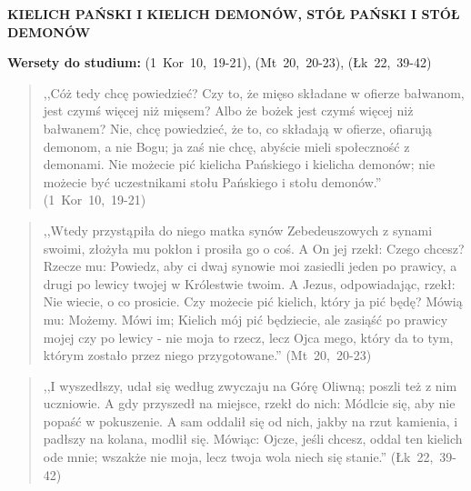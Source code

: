 \documentclass[10pt,a4paper,oneside]{article}
\begin{document}
\centerline{\textbf{\MakeUppercase{Kielich Pański i kielich demonów, stół Pański i stół demonów}}}
\begin{center}
\textbf{Wersety do studium:} \mbox{(1 Kor 10, 19-21)}, \mbox{(Mt 20, 20-23)}, \mbox{(Łk 22, 39-42)}
\end{center}
\begin{quote}
,,Cóż tedy chcę powiedzieć? Czy to, że mięso składane w ofierze bałwanom, jest czymś więcej niż mięsem? Albo że bożek jest czymś więcej niż bałwanem? Nie, chcę powiedzieć, że to, co składają w ofierze, ofiarują demonom, a nie Bogu; ja zaś nie chcę, abyście mieli społeczność z demonami. Nie możecie pić kielicha Pańskiego i kielicha demonów; nie możecie być uczestnikami stołu Pańskiego i stołu demonów.'' \mbox{(1 Kor 10, 19-21)}
\end{quote}
\begin{quote}
,,Wtedy przystąpiła do niego matka synów Zebedeuszowych z synami swoimi, złożyła mu pokłon i prosiła go o coś. A On jej rzekł: Czego chcesz? Rzecze mu: Powiedz, aby ci dwaj synowie moi zasiedli jeden po prawicy, a drugi po lewicy twojej w Królestwie twoim. A Jezus, odpowiadając, rzekł: Nie wiecie, o co prosicie. Czy możecie pić kielich, który ja pić będę? Mówią mu: Możemy. Mówi im; Kielich mój pić będziecie, ale zasiąść po prawicy mojej czy po lewicy - nie moja to rzecz, lecz Ojca mego, który da to tym, którym zostało przez niego przygotowane.'' \mbox{(Mt 20, 20-23)}
\end{quote}
\begin{quote}
,,I wyszedłszy, udał się według zwyczaju na Górę Oliwną; poszli też z nim uczniowie. A gdy przyszedł na miejsce, rzekł do nich: Módlcie się, aby nie popaść w pokuszenie. A sam oddalił się od nich, jakby na rzut kamienia, i padłszy na kolana, modlił się. Mówiąc: Ojcze, jeśli chcesz, oddal ten kielich ode mnie; wszakże nie moja, lecz twoja wola niech się stanie.'' \mbox{(Łk 22, 39-42)}
\end{quote}
\end{document}

